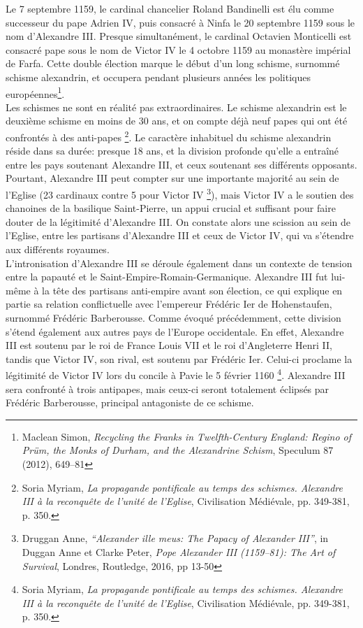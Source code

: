 Le 7 septembre 1159, le cardinal chancelier Roland Bandinelli est élu comme successeur du pape Adrien IV, puis consacré à Ninfa le 20 septembre 1159 sous le nom d’Alexandre III. Presque simultanément, le cardinal Octavien Monticelli est consacré pape sous le nom de Victor IV le 4 octobre 1159 au monastère impérial de Farfa. Cette double élection marque le début d’un long schisme, surnommé schisme alexandrin, et occupera pendant plusieurs années les politiques européennes\footnote{Maclean Simon, \textit{Recycling the Franks in Twelfth-Century England: Regino of Prüm, the Monks of Durham, and the Alexandrine Schism},  Speculum 87 (2012), 649–81}.\\ 
Les schismes ne sont en réalité pas extraordinaires. Le schisme alexandrin est le deuxième schisme en moins de 30 ans, et on compte déjà neuf papes qui ont été confrontés à des anti-papes \footnote{Soria Myriam, \textit{La propagande pontificale au temps des schismes. Alexandre III à la reconquête de l’unité de l'Eglise}, Civilisation Médiévale, pp. 349-381, p. 350.}. Le caractère inhabituel du schisme alexandrin réside dans sa durée: presque 18 ans, et la division profonde qu’elle a entraîné entre les pays soutenant Alexandre III, et ceux soutenant ses différents opposants. Pourtant, Alexandre III peut compter sur une importante majorité au sein de l’Eglise (23 cardinaux contre 5 pour Victor IV \footnote{Druggan Anne, \textit{“Alexander ille meus: The Papacy of Alexander III”}, in Duggan Anne et Clarke Peter, \textit{Pope Alexander III (1159–81): The Art of Survival}, Londres, Routledge, 2016, pp 13-50}), mais Victor IV a le soutien des chanoines de la basilique Saint-Pierre, un appui crucial et suffisant pour faire douter de la légitimité d’Alexandre III. On constate alors une scission au sein de l’Eglise, entre les partisans d’Alexandre III et ceux de Victor IV, qui va s’étendre aux différents royaumes.\\ 
L’intronisation d’Alexandre III se déroule également dans un contexte de tension entre la papauté et le Saint-Empire-Romain-Germanique. Alexandre III fut lui-même à la tête des partisans anti-empire avant son élection, ce qui explique en partie sa relation conflictuelle avec l’empereur Frédéric Ier de Hohenstaufen, surnommé Frédéric Barberousse. Comme évoqué précédemment, cette division s’étend également aux autres pays de l’Europe occidentale. En effet, Alexandre III est soutenu par le roi de France Louis VII et le roi d’Angleterre Henri II, tandis que Victor IV, son rival, est soutenu par Frédéric Ier. Celui-ci proclame la légitimité de Victor IV lors du concile à Pavie le 5 février 1160 \footnote{Soria Myriam, \textit{La propagande pontificale au temps des schismes. Alexandre III à la reconquête de l’unité de l'Eglise}, Civilisation Médiévale, pp. 349-381, p. 350.}. Alexandre III sera confronté à trois antipapes, mais ceux-ci seront totalement éclipsés par Frédéric Barberousse, principal antagoniste de ce schisme.


